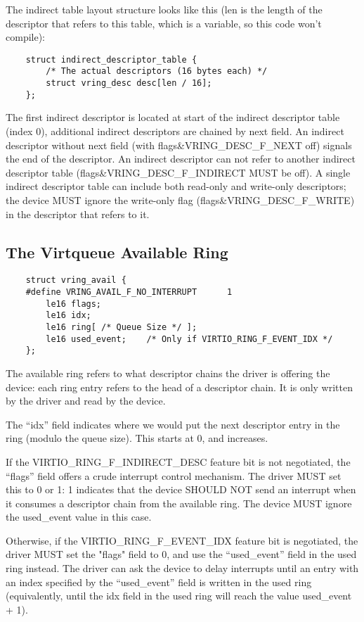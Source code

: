 The indirect table layout structure looks like this
(len is the length of the descriptor that refers to this table,
which is a variable, so this code won't compile):

\begin{lstlisting}
	struct indirect_descriptor_table {
		/* The actual descriptors (16 bytes each) */
		struct vring_desc desc[len / 16];
	};
\end{lstlisting}

The first indirect descriptor is located at start of the indirect
descriptor table (index 0), additional indirect descriptors are
chained by next field. An indirect descriptor without next field
(with flags\&VRING_DESC_F_NEXT off) signals the end of the descriptor.
An
indirect descriptor can not refer to another indirect descriptor
table (flags\&VRING_DESC_F_INDIRECT MUST be off). A single indirect descriptor
table can include both read-only and write-only descriptors;
the device MUST ignore the write-only flag (flags\&VRING_DESC_F_WRITE) in the descriptor that refers to it.

\subsection{The Virtqueue Available Ring}\label{sec:Basic Facilities of a Virtio Device / Virtqueues / The Virtqueue Available Ring}

\begin{lstlisting}
	struct vring_avail {
	#define VRING_AVAIL_F_NO_INTERRUPT      1
		le16 flags;
		le16 idx;
		le16 ring[ /* Queue Size */ ];
		le16 used_event;	/* Only if VIRTIO_RING_F_EVENT_IDX */
	};
\end{lstlisting}

The available ring refers to what descriptor chains the driver is offering the
device: each ring entry refers to the head of a descriptor chain.  It is only
written by the driver and read by the device.

The “idx” field indicates where we would put the next descriptor
entry in the ring (modulo the queue size). This starts at 0, and increases.

If the VIRTIO_RING_F_INDIRECT_DESC feature bit is not negotiated, the
“flags” field offers a crude interrupt control mechanism.  The driver
MUST set this to 0 or 1: 1 indicates that the device SHOULD NOT send
an interrupt when it consumes a descriptor chain from the available
ring.  The device MUST ignore the used_event value in this case.

Otherwise, if the VIRTIO_RING_F_EVENT_IDX feature bit is negotiated,
the driver MUST set the "flags" field to 0, and use the “used_event”
field in the used ring instead.  The driver can ask the device to delay interrupts
until an entry with an index specified by the “used_event” field is
written in the used ring (equivalently, until the idx field in the
used ring will reach the value used_event + 1).

